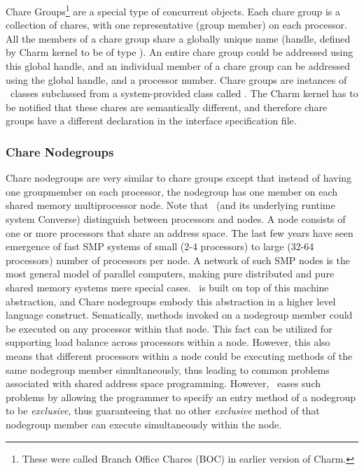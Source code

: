 Chare Groups\footnote{ These were called Branch Office Chares (BOC) in earlier
version of Charm.  } are a special type of concurrent objects.  Each chare
group is a collection of chares, with one representative (group member) on each
processor. All the members of a chare group share a globally unique name
(handle, defined by Charm kernel to be of type ). An entire
chare group could be addressed using this global handle, and an individual
member of a chare group can be addressed using the global handle, and a
processor number. Chare groups are instances of \CC\ classes subclassed from a
system-provided class called . The Charm kernel has to be notified
that these chares are semantically different, and therefore chare groups have a
different declaration in the interface specification file.

\subsubsection{Chare Nodegroups}

Chare nodegroups are very similar to chare groups except that instead of having
one groupmember on each processor, the nodegroup has one member on each shared
memory multiprocessor node. Note that \charmpp\ (and its underlying runtime
system Converse) distinguish between processors and nodes. A node consists of
one or more processors that share an address space. The last few years have
seen emergence of fast SMP systems of small (2-4 processors) to large (32-64
processors) number of processors per node. A network of such SMP nodes is the
most general model of parallel computers, making pure distributed and pure
shared memory systems mere special cases. \charmpp\ is built on top of this
machine abstraction, and Chare nodegroups embody this abstraction in a higher
level language construct. Sematically, methods invoked on a nodegroup member
could be executed on any processor within that node. This fact can be utilized
for supporting load balance across processors within a node. However, this also
means that different processors within a node could be executing methods of the
same nodegroup member simultaneously, thus leading to common problems
associated with shared address space programming. However, \charmpp\ eases such
problems by allowing the programmer to specify an entry method of a nodegroup
to be {\em exclusive}, thus guaranteeing that no other {\em exclusive} method
of that nodegroup member can execute simultaneously within the node.

